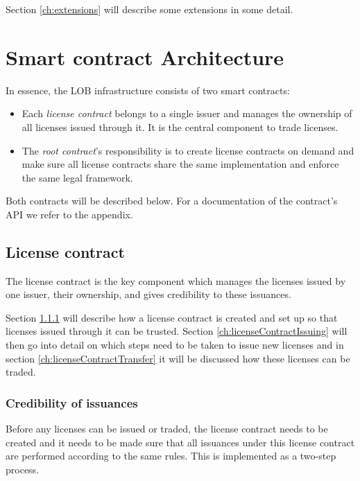 \documentclass[a4paper]{article}
\begin{document}
Section \ref{ch:extensions} will describe some extensions in some detail.



\section{Smart contract Architecture}
\label{ch:smartContractArchitecture}

In essence, the LOB infrastructure consists of two smart contracts: 
\begin{itemize}
  \item Each \emph{license contract} belongs to a single issuer and manages the ownership of all licenses issued through it. It is the central component to trade licenses.
  \item The \emph{root contract}'s responsibility is to create license contracts on demand and make sure all license contracts share the same implementation and enforce the same legal framework.
\end{itemize}

Both contracts will be described below. For a documentation of the contract's API we refer to the appendix.





\subsection{License contract}
The license contract is the key component which manages the licenses issued by one issuer, their ownership, and gives credibility to these issuances. 

Section \ref{ch:licenseContractCredibility} will describe how a license contract is created and set up so that licenses issued through it can be trusted. Section \ref{ch:licenseContractIssuing} will then go into detail on which steps need to be taken to issue new licenses and in section \ref{ch:licenseContractTransfer} it will be discussed how these licenses can be traded. 





\subsubsection{Credibility of issuances}
\label{ch:licenseContractCredibility}

Before any licenses can be issued or traded, the license contract needs to be created and it needs to be made sure that all issuances under this license contract are performed according to the same rules. This is implemented as a two-step process.
\end{document}
